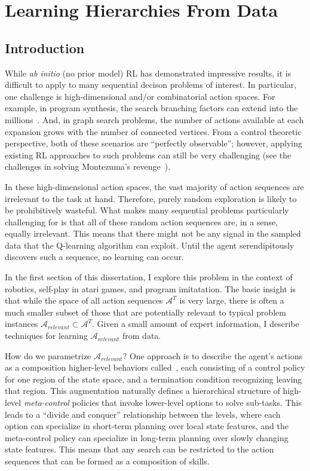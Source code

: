 \chapter{Learning Hierarchies From Data}
\setcounter{secnumdepth}{1}
\section{Introduction}
While \emph{ab initio} (no prior model) RL  has demonstrated impressive results, it is difficult to apply to many sequential decison problems of interest. 
In particular, one challenge is high-dimensional and/or combinatorial action spaces.
 For example, in program synthesis, the search branching factors can extend into the millions~\cite{menon2013machine}. And, in graph search problems, the number of actions available at each expansion grows with the number of connected vertices. From a control theoretic perspective, both of these scenarios are ``perfectly observable''; however, applying existing RL approaches to such problems can still be very challenging (see the challenges in solving Montezuma's revenge~\cite{bellemare2016unifying}).

In these high-dimensional action spaces, the vast majority of action sequences are irrelevant to the task at hand.
Therefore, purely random exploration is likely to be prohibitively wasteful.
What makes many sequential problems particularly challenging for is that all of these random action sequences are, in a sense, equally irrelevant. 
This means that there might not be any signal in the sampled data that the Q-learning algorithm can exploit.
Until the agent serendipitously discovers such a sequence, no learning can occur.

In the first section of this dissertation, I explore this problem in the context of robotics, self-play in atari games, and program imitatation. 
The basic insight is that while the space of all action sequences $\mathcal{A}^T$ is very large, there is often a much smaller subset of those that are potentially relevant to typical problem instances $\mathcal{A}_{relevant} \subset \mathcal{A}^T$. 
Given a small amount of expert information, I describe techniques for learning $\mathcal{A}_{relevant}$ from data.

How do we parametrize $\mathcal{A}_{relevant}$?
One approach is to describe the agent's actions as a composition higher-level behaviors called~\cite{suttonPS99}, each consisting of a control policy for one region of the state space, and a termination condition recognizing leaving that region. This augmentation naturally defines a hierarchical structure of high-level \emph{meta-control} policies that invoke lower-level options to solve sub-tasks.
This leads to a ``divide and conquer'' relationship between the levels, where each option can specialize in short-term planning over local state features, and the meta-control policy can specialize in long-term planning over slowly changing state features.
This means that any search can be restricted to the action sequences that can be formed as a composition of skills.



